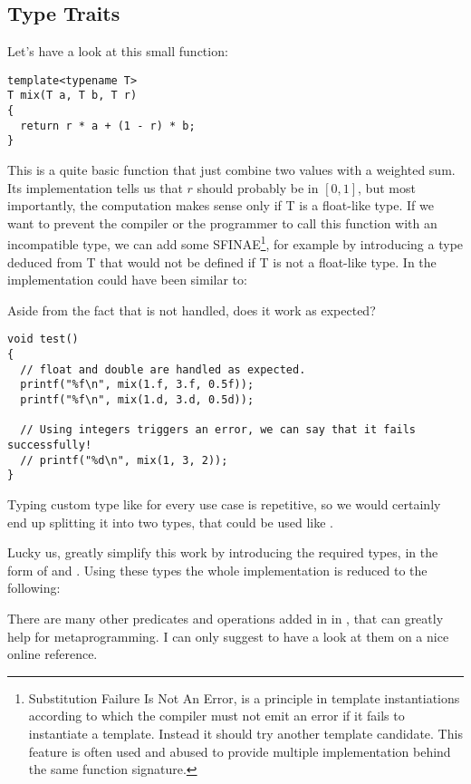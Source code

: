 \subsection{Type Traits}

Let's have a look at this small function:

\begin{lstlisting}
template<typename T>
T mix(T a, T b, T r)
{
  return r * a + (1 - r) * b;
}
\end{lstlisting}

This is a quite basic function that just combine two values with a
weighted sum. Its implementation tells us that $r$ should probably be
in $[0, 1]$, but most importantly, the computation makes sense only if
T is a float-like type. If we want to prevent the compiler or the
programmer to call this function with an incompatible type, we can add
some SFINAE\footnote{Substitution Failure Is Not An Error, is a
  principle in template instantiations according to which the compiler
  must not emit an error if it fails to instantiate a
  template. Instead it should try another template candidate. This
  feature is often used and abused to provide multiple implementation
  behind the same function signature.}, for example by introducing a
type deduced from T that would not be defined if T is not a float-like
type. In  the implementation could have been similar to:


Aside from the fact that  is not handled, does it
work as expected?

\begin{lstlisting}
void test()
{
  // float and double are handled as expected.
  printf("%f\n", mix(1.f, 3.f, 0.5f));
  printf("%f\n", mix(1.d, 3.d, 0.5d));

  // Using integers triggers an error, we can say that it fails successfully!
  // printf("%d\n", mix(1, 3, 2));
}
\end{lstlisting}

Typing custom type like  for every use
case is repetitive, so we would certainly end up splitting it into two
types, that could be used like
.

\bigskip

%
%
Lucky us,  greatly simplify this work by introducing the
required types, in the form of  and
. Using these types the whole
implementation is reduced to the following:


There are many other predicates and operations added in
 in , that can greatly help for
metaprogramming. I can only suggest to have a look at them on a nice
online reference.

